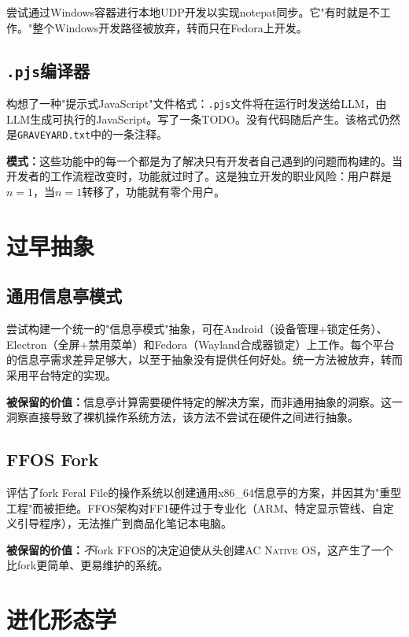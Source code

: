 \documentclass[10pt,letterpaper,twocolumn]{article}
\newcommand{\acos}{\textsc{AC Native OS}}
\begin{document}
尝试通过Windows容器进行本地UDP开发以实现notepat同步。它"有时就是不工作。"整个Windows开发路径被放弃，转而只在Fedora上开发。

\subsection{\texttt{.pjs}编译器}

构想了一种"提示式JavaScript"文件格式：\texttt{.pjs}文件将在运行时发送给LLM，由LLM生成可执行的JavaScript。写了一条TODO。没有代码随后产生。该格式仍然是\texttt{GRAVEYARD.txt}中的一条注释。

\textbf{模式：}这些功能中的每一个都是为了解决只有开发者自己遇到的问题而构建的。当开发者的工作流程改变时，功能就过时了。这是独立开发的职业风险：用户群是$n=1$，当$n=1$转移了，功能就有零个用户。

\section{过早抽象}

\subsection{通用信息亭模式}

尝试构建一个统一的"信息亭模式"抽象，可在Android（设备管理+锁定任务）、Electron（全屏+禁用菜单）和Fedora（Wayland合成器锁定）上工作。每个平台的信息亭需求差异足够大，以至于抽象没有提供任何好处。统一方法被放弃，转而采用平台特定的实现。

\textbf{被保留的价值：}信息亭计算需要硬件特定的解决方案，而非通用抽象的洞察。这一洞察直接导致了裸机操作系统方法，该方法不尝试在硬件之间进行抽象。

\subsection{FFOS Fork}

评估了fork Feral File的操作系统以创建通用x86\_64信息亭的方案，并因其为"重型工程"而被拒绝。FFOS架构对FF1硬件过于专业化（ARM、特定显示管线、自定义引导程序），无法推广到商品化笔记本电脑。

\textbf{被保留的价值：}\emph{不}fork FFOS的决定迫使从头创建\acos{}，这产生了一个比fork更简单、更易维护的系统。

\section{进化形态学}
\end{document}
